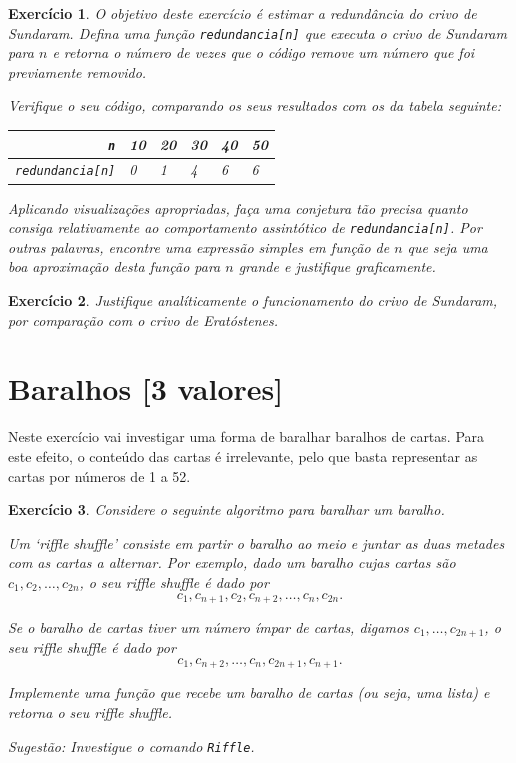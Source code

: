 \documentclass{article}
\newtheorem{ex}{Exercício}[section]
\begin{document}
\begin{ex}
O objetivo deste exercício é estimar a redundância do crivo de Sundaram. Defina uma função \texttt{redundancia[n]} que executa o crivo de Sundaram para $n$ e retorna o número de vezes que o código remove um número que foi previamente removido.

Verifique o seu código, comparando os seus resultados com os da tabela seguinte:


\begin{center}
\begin{tabular}{r|lllll}
\texttt{n} & 10 & 20 & 30 & 40 & 50 \\
\hline
\texttt{redundancia[n]} & 0 & 1 & 4 & 6 & 6 \\
\end{tabular}
\end{center}

Aplicando visualizações apropriadas, faça uma conjetura tão precisa quanto consiga relativamente ao comportamento assintótico de \texttt{redundancia[n]}. Por outras palavras, encontre uma expressão simples em função de $n$ que seja uma boa aproximação desta função para $n$ grande e justifique graficamente.
\end{ex}

\begin{ex}
Justifique analíticamente o funcionamento do crivo de Sundaram, por comparação com o crivo de Eratóstenes.
\end{ex}

\section{Baralhos [3 valores]}

Neste exercício vai investigar uma forma de baralhar baralhos de cartas. Para este efeito, o conteúdo das cartas é irrelevante, pelo que basta representar as cartas por números de 1 a 52.

\begin{ex}
Considere o seguinte algoritmo para baralhar um baralho.

Um `riffle shuffle' consiste em partir o baralho ao meio e juntar as duas metades com as cartas a alternar. Por exemplo, dado um baralho cujas cartas são $c_1, c_2, \dots, c_{2n}$, o seu riffle shuffle é dado por
\[c_1, c_{n+1}, c_2, c_{n+2}, \dots, c_n, c_{2n}.\]

Se o baralho de cartas tiver um número ímpar de cartas, digamos $c_1, \dots, c_{2n+1}$, o seu riffle shuffle é dado por
\[c_1, c_{n+2}, \dots, c_n, c_{2n+1}, c_{n+1}.\]

Implemente uma função que recebe um baralho de cartas (ou seja, uma lista) e retorna o seu riffle shuffle.

\smallskip

Sugestão: Investigue o comando  \texttt{Riffle}.
\end{ex}
\end{document}
